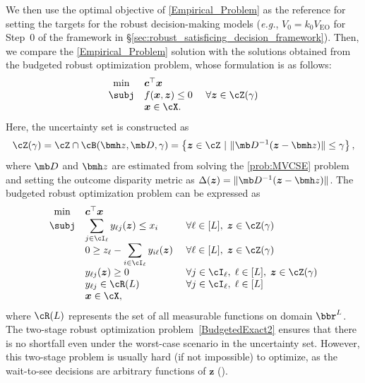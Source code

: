 \documentclass[mnsc, nonblindrev]{informswp}
\newcommand{\1}[1]{\mathds{1}{\left(#1\right)}}
\begin{document}
We then use the optimal objective of \ref{Empirical_Problem} as the reference for setting the targets for the robust decision-making models (\textit{e.g.}, $V_0 = k_0 V_{\mathrm{EO}}$ for Step~$0$ of the framework in \S \ref{sec:robust_satisficing_decision_framework}).
Then, we compare the \ref{Empirical_Problem} solution with the solutions obtained from the budgeted robust optimization problem, whose formulation is as follows:
\[
\begin{array}{cll}
\min & \bm c^\top \bm x \\
     \subj 
     & \displaystyle f(\bm x,\bm z)  \leq 0 &~ \forall \bm z \in \cZ(\gamma)\\
     &  {\bm x} \in \cX.
\end{array} 
\]
Here, the uncertainty set is constructed as  
$$
\cZ(\gamma) = \cZ \cap \cB(\bmh z, \mb D, \gamma) = \left\{ \bm z \in \cZ ~|~  \| \mb D^{-1} ( {\bm z} - \bmh z ) \| \leq \gamma \right\}, 
$$
where $\mb D$ and $\bmh z$ are estimated from solving the \ref{prob:MVCSE} problem and setting the outcome disparity metric as $\Delta(\bm z) = \| \mb D^{-1} ( {\bm z} - \bmh z ) \|$.
The budgeted robust optimization problem can be expressed as 
 \begin{equation}\label{BudgetedExact2}
\begin{array}{cll}
\min &  \bm c^\top \bm x \\
     \subj 
     & \displaystyle \sum_{j \in \cI_\ell} y_{\ell j}(\bm z) \leq x_i &~ \forall \ell \in [L],\; \bm z \in \cZ(\gamma)\\
     & \displaystyle 0\geq z_{\ell} - \sum_{i \in \cI_\ell} y_{i \ell}(\bm z) &~ \forall \ell \in [L],\; \bm z \in \cZ(\gamma) \\
     & y_{\ell j}(\bm z) \geq 0 &~ \forall  j \in \cI_\ell,\; \ell \in [L],\; \bm z \in \cZ(\gamma) \\
     & y_{\ell j}\in \cR(L) &~ \forall j \in \cI_\ell,\; \ell \in [L] \\
     &  {\bm x} \in \cX,
\end{array}
\end{equation}
where $\cR(L)$ represents the set of all measurable functions on domain $\bbr^{L}$. The two-stage robust optimization problem~\eqref{BudgetedExact2} ensures that there is no shortfall even under the worst-case scenario in the uncertainty set. However, this two-stage problem is usually hard (if not impossible) to optimize, as the wait-to-see decisions are arbitrary functions of $\bm z$ (\citealt{Bental_Goryashko_Guslitzer_Nemirovski_2004adjustable, atamturk2007two}).
\end{document}
